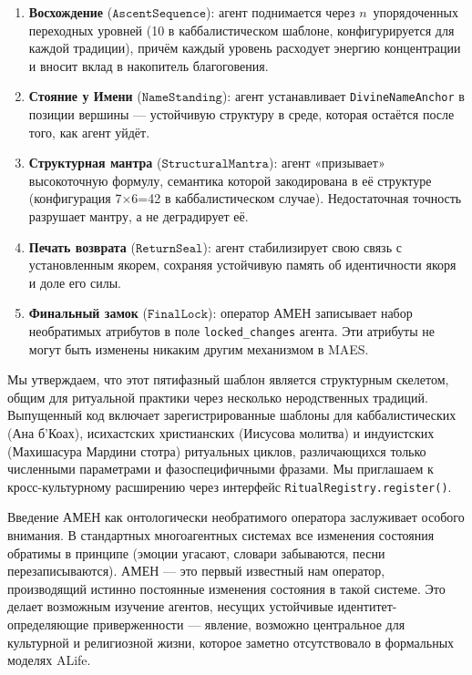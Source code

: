 \documentclass[11pt,a4paper]{article}
\begin{document}
\begin{enumerate}
\item \textbf{Восхождение} ($\texttt{AscentSequence}$): агент поднимается
      через $n$~упорядоченных переходных уровней (10 в каббалистическом
      шаблоне, конфигурируется для каждой традиции), причём каждый
      уровень расходует энергию концентрации и вносит вклад в накопитель
      благоговения.
\item \textbf{Стояние у Имени} ($\texttt{NameStanding}$): агент
      устанавливает \texttt{DivineNameAnchor} в позиции вершины ---
      устойчивую структуру в среде, которая остаётся после того, как
      агент уйдёт.
\item \textbf{Структурная мантра} ($\texttt{StructuralMantra}$): агент
      «призывает» высокоточную формулу, семантика которой закодирована в
      её структуре (конфигурация 7$\times$6=42 в каббалистическом случае).
      Недостаточная точность разрушает мантру, а не деградирует её.
\item \textbf{Печать возврата} ($\texttt{ReturnSeal}$): агент
      стабилизирует свою связь с установленным якорем, сохраняя устойчивую
      память об идентичности якоря и доле его силы.
\item \textbf{Финальный замок} ($\texttt{FinalLock}$): оператор АМЕН
      записывает набор необратимых атрибутов в поле
      \texttt{locked\_changes} агента. Эти атрибуты не могут быть
      изменены никаким другим механизмом в MAES.
\end{enumerate}

Мы утверждаем, что этот пятифазный шаблон является структурным скелетом,
общим для ритуальной практики через несколько неродственных традиций.
Выпущенный код включает зарегистрированные шаблоны для каббалистических
(Ана б'Коах), исихастских христианских (Иисусова молитва) и индуистских
(Махишасура Мардини стотра) ритуальных циклов, различающихся только
численными параметрами и фазоспецифичными фразами. Мы приглашаем к
кросс-культурному расширению через интерфейс
\texttt{RitualRegistry.register()}.

Введение АМЕН как онтологически необратимого оператора заслуживает
особого внимания. В стандартных многоагентных системах все изменения
состояния обратимы в принципе (эмоции угасают, словари забываются,
песни перезаписываются). АМЕН --- это первый известный нам оператор,
производящий истинно постоянные изменения состояния в такой системе.
Это делает возможным изучение агентов, несущих устойчивые
идентитет-определяющие приверженности --- явление, возможно центральное
для культурной и религиозной жизни, которое заметно отсутствовало в
формальных моделях ALife.
\end{document}
